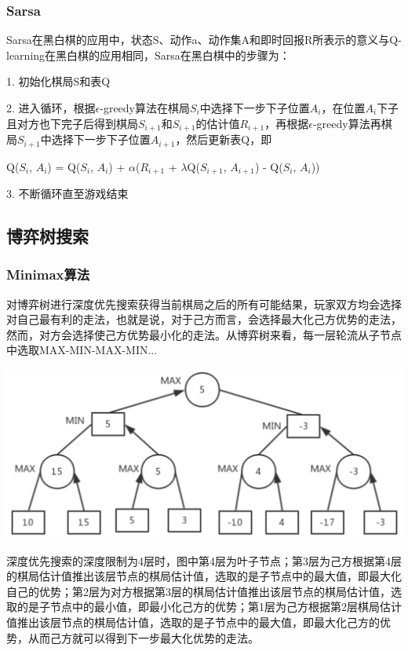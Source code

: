 \documentclass{article}
\begin{document}
\subsubsection{Sarsa\cite{r1}}
Sarsa在黑白棋的应用中，状态S、动作a、动作集A和即时回报R所表示的意义与Q-learning在黑白棋的应用相同，Sarsa在黑白棋中的步骤为：
\par
1. 初始化棋局S和表Q
\par
2. 进入循环，根据$\epsilon$-greedy算法在棋局$S_i$中选择下一步下子位置$A_i$，在位置$A_i$下子且对方也下完子后得到棋局$S_{i+1}$和$S_{i+1}$的估计值$R_{i+1}$，再根据$\epsilon$-greedy算法再棋局$S_{i+1}$中选择下一步下子位置$A_{i+1}$，然后更新表Q，即
\begin{center}
    {Q($S_i$, $A_i$) = Q($S_i$, $A_i$) + $\alpha$($R_{i+1}$ + $\lambda$Q($S_{i+1}$, $A_{i+1}$) - Q($S_i$, $A_i$))}
\end{center}
\par
3. 不断循环直至游戏结束

\subsection{博弈树搜索}
\subsubsection{Minimax算法\cite{r2}}
对博弈树进行深度优先搜索获得当前棋局之后的所有可能结果，玩家双方均会选择对自己最有利的走法，也就是说，对于己方而言，会选择最大化己方优势的走法，然而，对方会选择使己方优势最小化的走法。从博弈树来看，每一层轮流从子节点中选取MAX-MIN-MAX-MIN...
\begin{center}
    \includegraphics[scale=0.6]{1.PNG}
\end{center}
\par
深度优先搜索的深度限制为4层时，图中第4层为叶子节点；第3层为己方根据第4层的棋局估计值推出该层节点的棋局估计值，选取的是子节点中的最大值，即最大化自己的优势；第2层为对方根据第3层的棋局估计值推出该层节点的棋局估计值，选取的是子节点中的最小值，即最小化己方的优势；第1层为己方根据第2层棋局估计值推出该层节点的棋局估计值，选取的是子节点中的最大值，即最大化己方的优势，从而己方就可以得到下一步最大化优势的走法。
\end{document}
